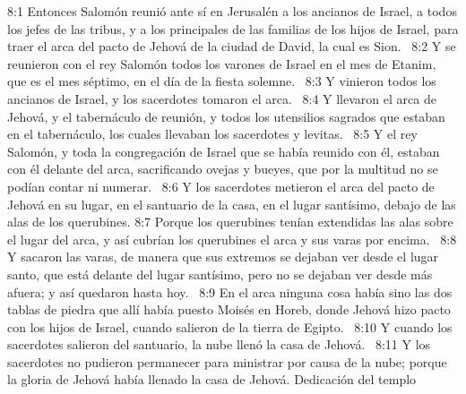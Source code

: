 8:1 Entonces Salomón reunió ante sí en Jerusalén a los ancianos de Israel, a todos los jefes de las tribus, y a los principales de las familias de los hijos de Israel, para traer el arca del pacto de Jehová de la ciudad de David, la cual es Sion.  
8:2 Y se reunieron con el rey Salomón todos los varones de Israel en el mes de Etanim, que es el mes séptimo, en el día de la fiesta solemne.  
8:3 Y vinieron todos los ancianos de Israel, y los sacerdotes tomaron el arca.  
8:4 Y llevaron el arca de Jehová, y el tabernáculo de reunión, y todos los utensilios sagrados que estaban en el tabernáculo, los cuales llevaban los sacerdotes y levitas.  
8:5 Y el rey Salomón, y toda la congregación de Israel que se había reunido con él, estaban con él delante del arca, sacrificando ovejas y bueyes, que por la multitud no se podían contar ni numerar.  
8:6 Y los sacerdotes metieron el arca del pacto de Jehová en su lugar, en el santuario de la casa, en el lugar santísimo, debajo de las alas de los querubines. 
8:7 Porque los querubines tenían extendidas las alas sobre el lugar del arca, y así cubrían los querubines el arca y sus varas por encima.  
8:8 Y sacaron las varas, de manera que sus extremos se dejaban ver desde el lugar santo, que está delante del lugar santísimo, pero no se dejaban ver desde más afuera; y así quedaron hasta hoy.  
8:9 En el arca ninguna cosa había sino las dos tablas de piedra que allí había puesto Moisés en Horeb, donde Jehová hizo pacto con los hijos de Israel, cuando salieron de la tierra de Egipto.  
8:10 Y cuando los sacerdotes salieron del santuario, la nube llenó la casa de Jehová.  
8:11 Y los sacerdotes no pudieron permanecer para ministrar por causa de la nube; porque la gloria de Jehová había llenado la casa de Jehová. 
Dedicación del templo  

